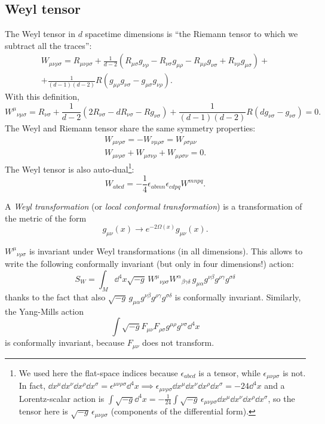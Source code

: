 \documentclass[a4paper,12pt]{book}
\begin{document}
\subsection{Weyl tensor}
The Weyl tensor in $d$ spacetime dimensions is ``the Riemann tensor to which we subtract all the traces'':
\begin{multline*}W_{\mu\nu\rho\sigma}=R_{\mu\nu\rho\sigma}+\frac1{d-2}(R_{\mu\sigma}g_{\nu\rho}-R_{\nu\sigma}g_{\mu\rho}-R_{\mu\rho}g_{\nu\sigma}+R_{\nu\rho}g_{\mu\sigma})+\\+\frac1{(d-1)(d-2)}R(g_{\mu\rho}g_{\nu\sigma}-g_{\mu\sigma}g_{\nu\rho}).\end{multline*}
With this definition,
\[W^\mu{}_{\nu\mu\sigma}=R_{\nu\sigma}+\frac1{d-2}(2R_{\nu\sigma}-dR_{\nu\sigma}-Rg_{\nu\sigma})+\frac1{(d-1)(d-2)}R(dg_{\nu\sigma}-g_{\nu\sigma})=0.\]
The Weyl and Riemann tensor share the same symmetry properties:
\begin{gather*}
W_{\mu\nu\rho\sigma}=-W_{\nu\mu\rho\sigma}=W_{\rho\sigma\mu\nu}\\
W_{\mu\nu\rho\sigma}+W_{\mu\sigma\nu\rho}+W_{\mu\rho\sigma\nu}=0.
\end{gather*}
The Weyl tensor is also auto-dual\footnote{We used here the flat-space indices because $\epsilon_{abcd}$ is a tensor, while $\epsilon_{\mu\nu\rho\sigma}$ is not. In fact, $\dd x^\mu\dd x^\nu\dd x^\rho\dd x^\sigma=\epsilon^{\mu\nu\rho\sigma}\dd^4x\implies\epsilon_{\mu\nu\rho\sigma}\dd x^\mu\dd x^\nu\dd x^\rho\dd x^\sigma=-24\dd^4x$ and a Lorentz-scalar action is $\int\sqrt{-g}\dd^4x=-\frac1{24}\int\sqrt{-g}\,\epsilon_{\mu\nu\rho\sigma}\dd x^\mu\dd x^\nu\dd x^\rho\dd x^\sigma$, so the tensor here is $\sqrt{-g}\,\epsilon_{\mu\nu\rho\sigma}$ (components of the differential form).}:
\[W_{abcd}=-\frac14\epsilon_{abmn}\epsilon_{cdpq}W^{mnpq}.\]

\begin{definition}
A \emph{Weyl transformation} (or \emph{local conformal transformation}) is a transformation of the metric of the form
\[g_{\mu\nu}(x)\longrightarrow e^{-2\Omega(x)}g_{\mu\nu}(x).\]
\end{definition}

$W^\mu{}_{\nu\rho\sigma}$ is invariant under Weyl transformations (in all dimensions). This allows to write the following conformally invariant (but only in four dimensions!) action:
\[S_W=\int_M\dd^4x\sqrt{-g}\,W^\mu{}_{\nu\rho\sigma}W^\alpha{}_{\beta\gamma\delta}\,g_{\mu\alpha}g^{\nu\beta}g^{\rho\gamma}g^{\sigma\delta}\]
thanks to the fact that also $\sqrt{-g}\,g_{\mu\alpha}g^{\nu\beta}g^{\rho\gamma}g^{\sigma\delta}$ is conformally invariant. Similarly, the Yang-Mills action
\[\int\sqrt{-g}F_{\mu\nu}F_{\rho\sigma}g^{\mu\rho}g^{\nu\sigma}\dd^4x\]
is conformally invariant, because $F_{\mu\nu}$ does not transform.
\end{document}
